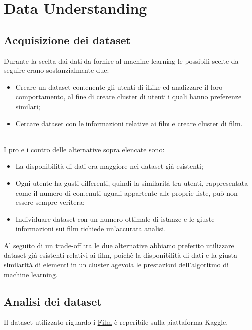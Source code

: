 \documentclass[a4paper, 10pt]{report}
\begin{document}
    \chapter{Data Understanding}\label{ch:data-understanding}

        \section{Acquisizione dei dataset}\label{sec:acquisizione-dei-dataset}
            Durante la scelta dai dati da fornire al machine learning le possibili scelte da seguire erano sostanzialmente due:
            \begin{itemize}
                \item Creare un dataset contenente gli utenti di iLike ed analizzare il loro comportamento, al fine di creare
                cluster di utenti i quali hanno preferenze similari;
                \item Cercare dataset con le informazioni relative ai film e creare cluster di film.
            \end{itemize}\\

            I pro e i contro delle alternative sopra elencate sono:
            \begin{itemize}
                \item La disponibilità di dati era maggiore nei dataset già esistenti;
                \item Ogni utente ha gusti differenti, quindi la similarità tra utenti, rappresentata come il numero di contenuti uguali
                appartente alle proprie liste, può non essere sempre veritera;
                \item Individuare dataset con un numero ottimale di istanze e le giuste informazioni sui film richiede
                un'accurata analisi.
            \end{itemize}
            Al seguito di un trade-off tra le due alternative abbiamo preferito utilizzare dataset già esistenti relativi ai film,
            poichè la disponibilità di dati e la giusta similarità di elementi in un cluster agevola le prestazioni dell'algoritmo
            di machine learning.

        \section{Analisi dei dataset}\label{sec:analisi-dei-dataset}
            Il dataset utilizzato riguardo i \href{https://www.kaggle.com/datasets/stefanoleone992/filmtv-movies-dataset?resource=download}{\underline{Film}}
            è reperibile sulla piattaforma Kaggle.
\end{document}
